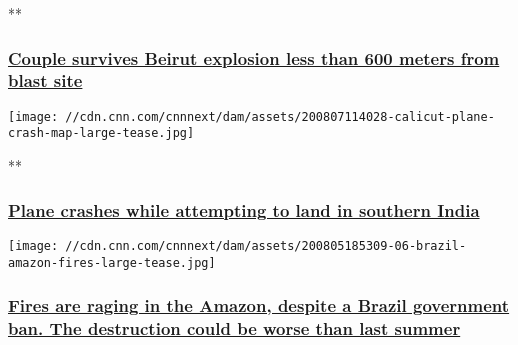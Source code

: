 **

\hypertarget{couple-survives-beirut-explosion-less-than-600-meters-from-blast-site}{%
\subsubsection{\texorpdfstring{\href{/videos/world/2020/08/07/beirut-explosion-survivors-lon-orig-bks.cnn}{Couple
survives Beirut explosion less than 600 meters from blast
site}}{Couple survives Beirut explosion less than 600 meters from blast site}}\label{couple-survives-beirut-explosion-less-than-600-meters-from-blast-site}}

\href{/videos/world/2020/08/07/india-plane-crash-intl-ldn-vpx.cnn}{}

\texttt{[image: //cdn.cnn.com/cnnnext/dam/assets/200807114028-calicut-plane-crash-map-large-tease.jpg]}

**

\hypertarget{plane-crashes-while-attempting-to-land-in-southern-india}{%
\subsubsection{\texorpdfstring{\href{/videos/world/2020/08/07/india-plane-crash-intl-ldn-vpx.cnn}{Plane
crashes while attempting to land in southern
India}}{Plane crashes while attempting to land in southern India}}\label{plane-crashes-while-attempting-to-land-in-southern-india}}

\href{/2020/08/07/americas/brazil-bolsonaro-amazon-fires-intl/index.html}{}

\texttt{[image: //cdn.cnn.com/cnnnext/dam/assets/200805185309-06-brazil-amazon-fires-large-tease.jpg]}

\hypertarget{fires-are-raging-in-the-amazon-despite-a-brazil-government-ban-the-destruction-could-be-worse-than-last-summer-1}{%
\subsubsection{\texorpdfstring{\href{/2020/08/07/americas/brazil-bolsonaro-amazon-fires-intl/index.html}{Fires
are raging in the Amazon, despite a Brazil government ban. The
destruction could be worse than last
summer}}{Fires are raging in the Amazon, despite a Brazil government ban. The destruction could be worse than last summer}}\label{fires-are-raging-in-the-amazon-despite-a-brazil-government-ban-the-destruction-could-be-worse-than-last-summer-1}}

\href{/2020/08/07/world/beirut-animal-rescue-reuniting-pets-trnd/index.html}{}

